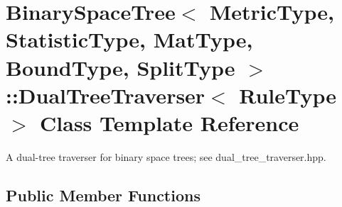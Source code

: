 \section{Binary\+Space\+Tree$<$ Metric\+Type, Statistic\+Type, Mat\+Type, Bound\+Type, Split\+Type $>$\+:\+:Dual\+Tree\+Traverser$<$ Rule\+Type $>$ Class Template Reference}
\label{classmlpack_1_1tree_1_1BinarySpaceTree_1_1DualTreeTraverser}


A dual-\/tree traverser for binary space trees; see dual\+\_\+tree\+\_\+traverser.\+hpp.  


\subsection*{Public Member Functions}

